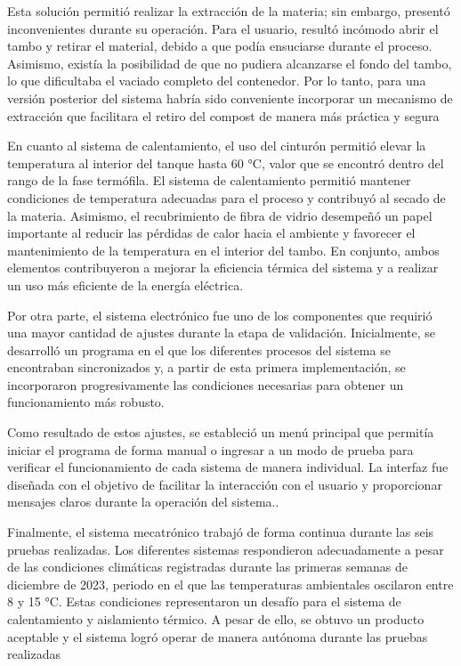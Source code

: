 Esta solución permitió realizar la extracción de la materia; sin embargo, presentó inconvenientes durante su operación. Para el usuario, resultó incómodo abrir el tambo y retirar el material, debido a que podía ensuciarse durante el proceso. Asimismo, existía la posibilidad de que no pudiera alcanzarse el fondo del tambo, lo que dificultaba el vaciado completo del contenedor. Por lo tanto, para una versión posterior del sistema habría sido conveniente incorporar un mecanismo de extracción que facilitara el retiro del compost de manera más práctica y segura

En cuanto al sistema de calentamiento, el uso del cinturón permitió elevar la temperatura al interior del tanque hasta 60 °C, valor que se encontró dentro del rango de la fase termófila. El sistema de calentamiento permitió mantener condiciones de temperatura adecuadas para el proceso y contribuyó al secado de la materia. Asimismo, el recubrimiento de fibra de vidrio desempeñó un papel importante al reducir las pérdidas de calor hacia el ambiente y favorecer el mantenimiento de la temperatura en el interior del tambo. En conjunto, ambos elementos contribuyeron a mejorar la eficiencia térmica del sistema y a realizar un uso más eficiente de la energía eléctrica.

Por otra parte, el sistema electrónico fue uno de los componentes que requirió una mayor cantidad de ajustes durante la etapa de validación. Inicialmente, se desarrolló un programa en el que los diferentes procesos del sistema se encontraban sincronizados y, a partir de esta primera implementación, se incorporaron progresivamente las condiciones necesarias para obtener un funcionamiento más robusto.

Como resultado de estos ajustes, se estableció un menú principal que permitía iniciar el programa de forma manual o ingresar a un modo de prueba para verificar el funcionamiento de cada sistema de manera individual. La interfaz fue diseñada con el objetivo de facilitar la interacción con el usuario y proporcionar mensajes claros durante la operación del sistema..

Finalmente, el sistema mecatrónico trabajó de forma continua durante las seis pruebas realizadas. Los diferentes sistemas respondieron adecuadamente a pesar de las condiciones climáticas registradas durante las primeras semanas de diciembre de 2023, periodo en el que las temperaturas ambientales oscilaron entre 8 y 15 °C. Estas condiciones representaron un desafío para el sistema de calentamiento y aislamiento térmico. A pesar de ello, se obtuvo un producto aceptable y el sistema logró operar de manera autónoma durante las pruebas realizadas
